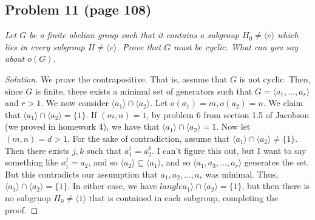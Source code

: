 \documentclass{article}
\begin{document}
\subsection*{Problem 11 (page 108)}
{\it Let $G$ be a finite abelian group such that it contains a subgroup
$H_0 \neq \langle e \rangle$ which lies in \emph{every} subgroup $H \neq \langle e \rangle$.
Prove that $G$ must be cyclic.
What can you say about $o(G)$.}
\begin{proof}[Solution]\let\qed\relax
	We prove the contrapositive. That is, assume that $G$ is not cyclic.
	Then, since $G$ is finite,
	there exists a minimal set of generators such that
	$G = \langle a_1,\dots,a_r \rangle$ and $r > 1$.
	We now consider $\langle a_1 \rangle \cap \langle a_2 \rangle$.
	Let $o(a_1) = m, o(a_2) = n$.
	We claim that $\langle a_1 \rangle \cap \langle a_2 \rangle = \{1\}$.
	If $(m,n) = 1$, by problem 6 from section 1.5 of Jacobson
	(we proved in homework 4),
	we have that $\langle a_1 \rangle \cap \langle a_2 \rangle = 1$.
	Now let $(m,n) = d > 1$.
	For the sake of contradiction, assume that $\langle a_1 \rangle \cap \langle a_2 \rangle \neq \{1\}$.
	Then there exists $j,k$ such that $a_1^j = a_2^k$.
	I can't figure this out, but I want to say something like $a_1^j = a_2$,
	and so $\langle a_2 \rangle \subseteq \langle a_1 \rangle$,
	and so $\langle a_1, a_3, \dots ,a_r \rangle$ generates the set.
	But this contradicts our assumption that $a_1,a_2,\dots,a_r$ was minimal.
	Thus, $\langle a_1 \rangle \cap \langle a_2 \rangle = \{1\}$.
	In either case, we have $langle a_1 \rangle \cap \langle a_2 \rangle = \{1\}$,
	but then there is no subgruop $H_0 \neq \langle 1 \rangle$
	that is contained in each subgroup, completing the proof.
\end{proof}
\end{document}

